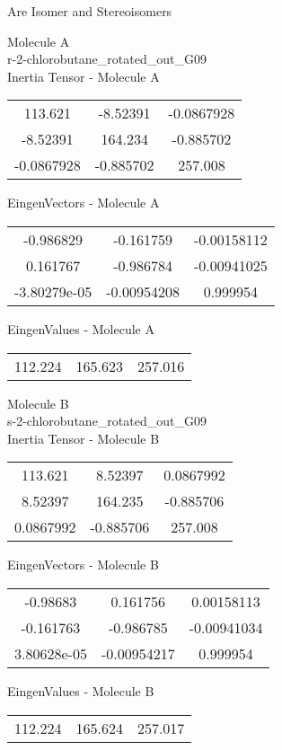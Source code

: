 \begin{center}
\vtab
\vtab
\textcolor{NavyBlue}{\Large Are Isomer and Stereoisomers}
\end{center}
\newpage
\begin{multicols}{2}
\begin{center}
Molecule A \\ 
r-2-chlorobutane\_rotated\_out\_G09
\\
Inertia Tensor - Molecule A \\
\vtab
\begin{tabular}{|c c c|}
113.621	 & 	-8.52391	 & 	-0.0867928	 \\
-8.52391	 & 	164.234	 & 	-0.885702	 \\
-0.0867928	 & 	-0.885702	 & 	257.008
\end{tabular}

\vtab
 EingenVectors - Molecule A     \\
\vtab
\begin{tabular}{|c c c|}
-0.986829	 & 	-0.161759	 & 	-0.00158112	 \\
0.161767	 & 	-0.986784	 & 	-0.00941025	 \\
-3.80279e-05	 & 	-0.00954208	 & 	0.999954
\end{tabular}

\vtab
 EingenValues - Molecule A     \\
\vtab
\begin{tabular}{|c c c|}
112.224	 & 	165.623	 & 	257.016
\end{tabular}
\columnbreak

Molecule B \\ 
s-2-chlorobutane\_rotated\_out\_G09
\\
Inertia Tensor - Molecule B \\
\vtab
\begin{tabular}{|c c c|}
113.621	 & 	8.52397	 & 	0.0867992	 \\
8.52397	 & 	164.235	 & 	-0.885706	 \\
0.0867992	 & 	-0.885706	 & 	257.008
\end{tabular}

\vtab
 EingenVectors - Molecule B     \\
\vtab
\begin{tabular}{|c c c|}
-0.98683	 & 	0.161756	 & 	0.00158113	 \\
-0.161763	 & 	-0.986785	 & 	-0.00941034	 \\
3.80628e-05	 & 	-0.00954217	 & 	0.999954
\end{tabular}

\vtab
 EingenValues - Molecule B     \\
\vtab
\begin{tabular}{|c c c|}
112.224	 & 	165.624	 & 	257.017
\end{tabular}

\end{center}
\end{multicols}
